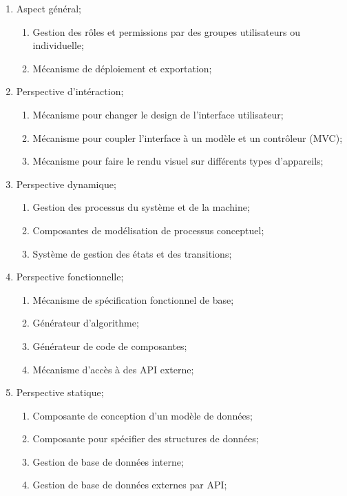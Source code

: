 \begin{enumerate}
    \item Aspect général;
    \begin{enumerate}
        \item Gestion des rôles et permissions par des groupes utilisateurs ou individuelle;
        \item Mécanisme de déploiement et exportation;
    \end{enumerate}
    \item Perspective d’intéraction;
    \begin{enumerate}
        \item Mécanisme pour changer le design de l’interface utilisateur;
        \item Mécanisme pour coupler l’interface à un modèle et un contrôleur (MVC);
        \item Mécanisme pour faire le rendu visuel sur différents types d’appareils;
    \end{enumerate}
    \item Perspective dynamique;
    \begin{enumerate}
        \item Gestion des processus du système et de la machine;
        \item Composantes de modélisation de processus conceptuel;
        \item Système de gestion des états et des transitions;
    \end{enumerate}
    \item Perspective fonctionnelle;
    \begin{enumerate}
        \item Mécanisme de spécification fonctionnel de base;
        \item Générateur d’algorithme;
        \item Générateur de code de composantes;
        \item Mécanisme d’accès à des API externe;
    \end{enumerate}
    \item Perspective statique;
    \begin{enumerate}
        \item Composante de conception d’un modèle de données;
        \item Composante pour spécifier des structures de données;
        \item Gestion de base de données interne;
        \item Gestion de base de données externes par API;
    \end{enumerate}
\end{enumerate}

